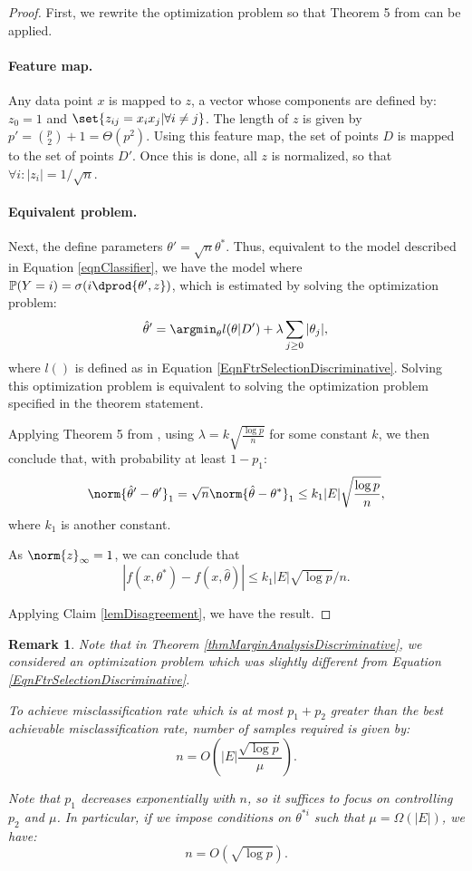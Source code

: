 \documentclass{article}
\newtheorem{remark}{Remark}
\def\thetaEst{\hat{\theta}}
\def\mprob{\mathbb{P}}
\begin{document}
\begin{proof}
First, we rewrite the optimization problem so that Theorem 5 from \cite{BachSelfConcordant} can be applied.

\paragraph*{Feature map.} Any data point $x$ is mapped to $z$, a vector whose components are defined by: $z_0 = 1$ and $\set{z_{ij} = x_i x_j | \forall i \neq j}$. The length of $z$ is given by $p' = \binom{p}{2} + 1 = \Theta(p^2)$. Using this feature map, the set of points $D$ is mapped to the set of points $D'$. Once this is done, all $z$ is normalized, so that $\forall i: |z_i| = 1/\sqrt{n}$.

\paragraph*{Equivalent problem.} Next, the define parameters $\theta' = \sqrt{n} \theta^*$. Thus, equivalent to the model described in Equation \ref{eqnClassifier}, we have the model where $\mprob(Y = i) = \sigma(i \dprod{\theta', z})$, which is estimated by solving the optimization problem:
\begin{equation}
\thetaEst' = \argmin_{\theta} l(\theta|D') + \lambda \sum_{j \geq 0}|\theta_j|, \\
\end{equation}
where $l()$ is defined as in Equation \ref{EqnFtrSelectionDiscriminative}. Solving this optimization problem is equivalent to solving the optimization problem specified in the theorem statement.

Applying Theorem 5 from \cite{BachSelfConcordant}, using $\lambda = k \sqrt{\frac{\log p}{n}}$ for some constant $k$, we then conclude that, with probability at least $1 - p_1$:
$$\norm{\thetaEst' - \theta'}_1  = \sqrt{n}\norm{\thetaEst - \theta^*}_1 \leq k_1 |E| \sqrt{\frac{\log p}{n}},$$
where $k_1$ is another constant.

As $\norm{z}_{\infty} = 1$, we can conclude that
$$|f(x, \theta^*) - f(x, \thetaEst)| \leq k_1 |E| \sqrt{\log p}/n.$$

Applying Claim \ref{lemDisagreement}, we have the result.
\end{proof}

\begin{remark}
Note that in Theorem \ref{thmMarginAnalysisDiscriminative}, we considered an optimization problem which was slightly different from Equation \ref{EqnFtrSelectionDiscriminative}.

To achieve misclassification rate which is at most $p_1 + p_2$ greater than the best achievable misclassification rate, number of samples required is given by:
$$n = O(|E|\frac{\sqrt{\log p}}{\mu}).$$

Note that $p_1$ decreases exponentially with $n$, so it suffices to focus on controlling $p_2$ and $\mu$. In particular, if we impose conditions on $\theta^{*i}$ such that $\mu = \Omega(|E|)$, we have:
$$n = O(\sqrt{\log p}).$$\end{remark}
\end{document}
